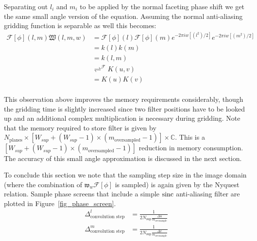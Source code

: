 Separating out $l_i$ and $m_i$ to be applied by the normal faceting phase shift we get the same small angle version of the equation. Assuming the 
normal anti-aliasing gridding function is separable as well this becomes:
\begin{equation}
   \begin{split}
   \mathcal{F}[\phi](l,m)\mathfrak{W}(l,m,w) &= \mathcal{F}[\phi](l)\mathcal{F}[\phi](m)e^{-2{\pi}iw[(l^2)/2]}e^{-2{\pi}iw[(m^2)/2]}\\
                             &= k(l)k(m)\\
                             &= k(l,m)\\
                             &\rightleftharpoons^\mathcal{F} K(u,v)\\
                             &=K(u)K(v)\\
   \end{split}
\end{equation}

This observation above improves the memory requirements considerably, though the gridding time is slightly increased since two filter positions have to be looked up
and an additional complex multiplication is necessary during gridding. Note that the memory required to store filter is given by 
$N_{\text{planes}}\times[W_{sup} + (W_{sup} - 1)\times(m_{\text{oversampled}} - 1)]\times\mathbb{C}$. This is 
a $[W_{sup} + (W_{sup} - 1)\times(m_{\text{oversampled}} - 1)]$ reduction in memory consumption. The accuracy of this 
small angle approximation is discussed in the next section.

To conclude this section we note that the sampling step size in the image domain (where the combination of $\mathfrak{w}_w\mathcal{F}[\phi]$ is sampled) is again given
by the Nyquest relation. Sample phase screens that include a simple $\operatorname*{sinc}$ anti-aliasing filter are plotted in Figure~\ref{fig_phase_screen}.
\begin{equation}
 \begin{split}
  \Delta^l_{\text{convolution step}}&=\frac{1}{2N_{\text{sup}}\frac{\Delta{u}}{m_{\text{oversample}}}}\\
  \Delta^m_{\text{convolution step}}&=\frac{1}{2N_{\text{sup}}\frac{\Delta{v}}{m_{\text{oversample}}}}\\
 \end{split}
\end{equation}

